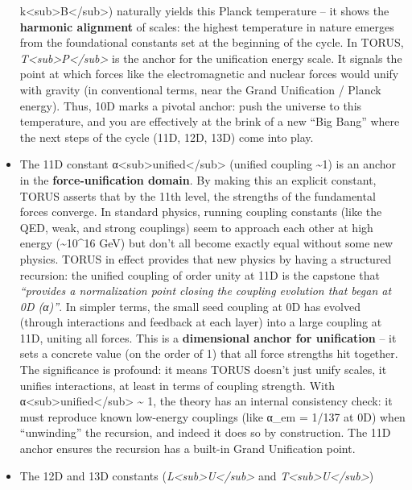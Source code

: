 \begin{itemize}
  k\textless{}sub\textgreater{}B\textless{}/sub\textgreater{}) naturally
  yields this Planck temperature -- it shows the \textbf{harmonic
  alignment} of scales: the highest temperature in nature emerges from
  the foundational constants set at the beginning of the cycle​. In
  TORUS,
  \emph{T\textless{}sub\textgreater{}P\textless{}/sub\textgreater{}} is
  the anchor for the unification energy scale. It signals the point at
  which forces like the electromagnetic and nuclear forces would unify
  with gravity (in conventional terms, near the Grand Unification /
  Planck energy). Thus, 10D marks a pivotal anchor: push the universe to
  this temperature, and you are effectively at the brink of a new ``Big
  Bang'' where the next steps of the cycle (11D, 12D, 13D) come into
  play.
\item
  The 11D constant
  α\textless{}sub\textgreater{}unified\textless{}/sub\textgreater{}
  (unified coupling \textasciitilde{}1) is an anchor in the
  \textbf{force-unification domain}. By making this an explicit
  constant, TORUS asserts that by the 11th level, the strengths of the
  fundamental forces converge. In standard physics, running coupling
  constants (like the QED, weak, and strong couplings) seem to approach
  each other at high energy (\textasciitilde{}10\^{}16 GeV) but don't
  all become exactly equal without some new physics. TORUS in effect
  provides that new physics by having a structured recursion: the
  unified coupling of order unity at 11D is the capstone that
  \emph{``provides a normalization point closing the coupling evolution
  that began at 0D (α)''}​. In simpler terms, the small seed coupling at
  0D has evolved (through interactions and feedback at each layer) into
  a large coupling at 11D, uniting all forces. This is a
  \textbf{dimensional anchor for unification} -- it sets a concrete
  value (on the order of 1) that all force strengths hit together. The
  significance is profound: it means TORUS doesn't just unify scales, it
  unifies interactions, at least in terms of coupling strength. With
  α\textless{}sub\textgreater{}unified\textless{}/sub\textgreater{}
  \textasciitilde{} 1, the theory has an internal consistency check: it
  must reproduce known low-energy couplings (like α\_em = 1/137 at 0D)
  when ``unwinding'' the recursion, and indeed it does so by
  construction. The 11D anchor ensures the recursion has a built-in
  Grand Unification point.
\item
  The 12D and 13D constants
  (\emph{L\textless{}sub\textgreater{}U\textless{}/sub\textgreater{}}
  and
  \emph{T\textless{}sub\textgreater{}U\textless{}/sub\textgreater{}})

\end{itemize}
